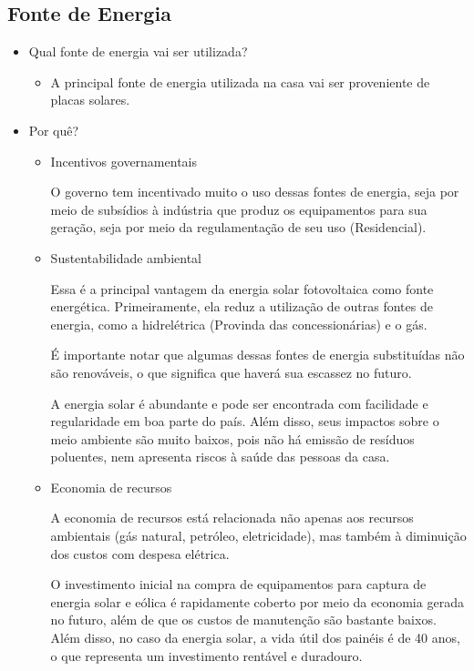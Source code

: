 	       \subsection{Fonte de Energia}
	           \begin{itemize}
        	       \item Qual fonte de energia vai ser utilizada?
            	       \begin{itemize}
            	            \item A principal fonte de energia utilizada na casa vai ser proveniente de placas solares.
            	       \end{itemize}
        	       \item Por quê?
        	            \begin{itemize}
        	                \item Incentivos governamentais
        	                    \par O governo tem incentivado muito o uso dessas fontes de energia, seja por meio de subsídios à indústria que produz os equipamentos para sua geração, seja por meio da regulamentação de seu uso (Residencial).
        	                \item Sustentabilidade ambiental
        	                    \par Essa é a principal vantagem da energia solar fotovoltaica como fonte energética. Primeiramente, ela reduz a utilização de outras fontes de energia, como a hidrelétrica (Provinda das concessionárias) e o gás. \cite{solarvolt}
                                \par É importante notar que algumas dessas fontes de energia substituídas não são renováveis, o que significa que haverá sua escassez no futuro.
                                \par A energia solar é abundante e pode ser encontrada com facilidade e regularidade em boa parte do país. Além disso, seus impactos sobre o meio ambiente são muito baixos, pois não há emissão de resíduos poluentes, nem apresenta riscos à saúde das pessoas da casa.
                            \item Economia de recursos
                                \par A economia de recursos está relacionada não apenas aos recursos ambientais (gás natural, petróleo, eletricidade), mas também à diminuição dos custos com despesa elétrica.
                                \par O investimento inicial na compra de equipamentos para captura de energia solar e eólica é rapidamente coberto por meio da economia gerada no futuro, além de que os custos de manutenção são bastante baixos. Além disso, no caso da energia solar, a vida útil dos painéis é de 40 anos, o que representa um investimento rentável e duradouro.

\end{itemize}
\end{itemize}
